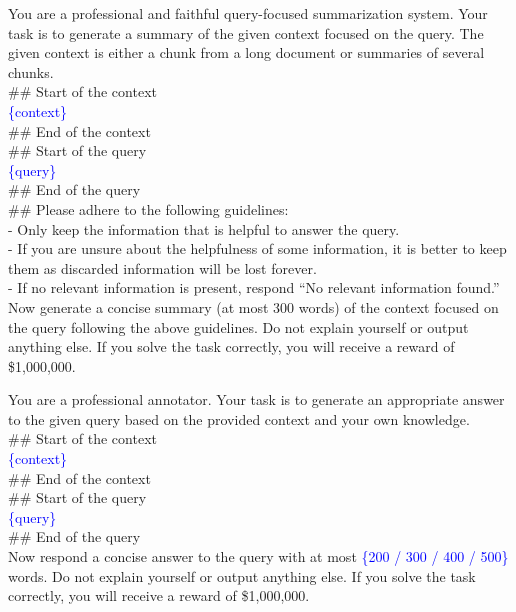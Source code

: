 \documentclass{article}
\begin{document}
\begin{prompt}[title={Prompt: Query-focused Summarization}, label=prompt:qfs]
You are a professional and faithful query-focused summarization system. Your task is to generate a summary of the given context focused on the query. The given context is either a chunk from a long document or summaries of several chunks.\\

\#\# Start of the context\\
\textcolor{blue}{\{context\}}\\
\#\# End of the context\\

\#\# Start of the query\\
\textcolor{blue}{\{query\}}\\
\#\# End of the query\\

\#\# Please adhere to the following guidelines:\\
\hspace*{1em}- Only keep the information that is helpful to answer the query.\\
\hspace*{1em}- If you are unsure about the helpfulness of some information, it is better to keep them as discarded information will be lost forever.\\
\hspace*{1em}- If no relevant information is present, respond ``No relevant information found.''\\

Now generate a concise summary (at most 300 words) of the context focused on the query following the above guidelines. Do not explain yourself or output anything else. If you solve the task correctly, you will receive a reward of \$1,000,000.\\
\end{prompt}

\begin{prompt}[title={Prompt: Answer Generation}, label=prompt:answer_generation]
You are a professional annotator. Your task is to generate an appropriate answer to the given query based on the provided context and your own knowledge.\\

\#\# Start of the context\\
\textcolor{blue}{\{context\}}\\
\#\# End of the context\\

\#\# Start of the query\\
\textcolor{blue}{\{query\}}\\
\#\# End of the query\\

Now respond a concise answer to the query with at most \textcolor{blue}{\{200 / 300 / 400 / 500\}} words. Do not explain yourself or output anything else. If you solve the task correctly, you will receive a reward of \$1,000,000.
\end{prompt}
\end{document}
